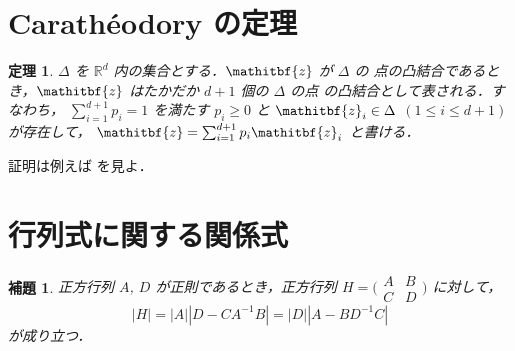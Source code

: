 \documentclass[master]{cimt}
\newtheorem{thm}{定理}
\newtheorem{lma}{補題}
\newcommand{\vz}{\mathitbf{z}}
\newcommand{\R}{{\mathbb{R}}}
\begin{document}
\appendix


\section{Carath\'{e}odory の定理}
\begin{thm}
$\Delta$ を $\R^d$ 内の集合とする．$\vz$ が $\Delta$ の
点の凸結合であるとき，$\vz$ はたかだか $d+1$ 個の $\Delta$ の点
の凸結合として表される．すなわち，
$\sum_{i=1}^{d+1}p_i = 1$ を満たす $p_i \geq 0$ と 
$\vz_i \in \Delta$ $(1 \leq i \leq d+1)$ が存在して，
$
	\vz = \sum_{i=1}^{d+1} p_i \vz_i
$
と書ける．
\end{thm}
証明は例えば \cite{Fukushima_nlopt} を見よ．


\section{行列式に関する関係式}
\begin{lma}
\label{lma:det}
正方行列 $A$, $D$ が正則であるとき，正方行列 
$
	H = \bigl( \begin{smallmatrix} A & B \\ C & D \end{smallmatrix} \bigr)
$
に対して，
\begin{equation*}
	|H| = |A| | D-  C A^{-1}B| = |D| | A -  B D^{-1} C |
\end{equation*}
が成り立つ．
\end{lma}
\end{document}
